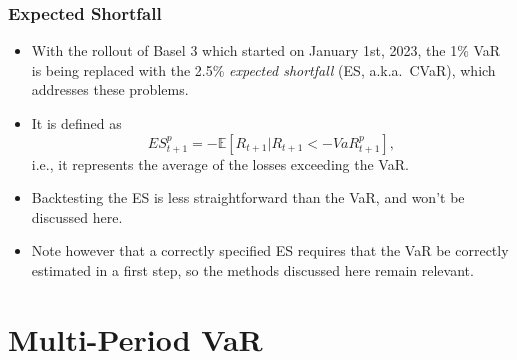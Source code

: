 \begin{frame}%

\frametitle{Expected Shortfall}

\begin{itemize}
\item With the rollout of Basel 3 which started on January 1st, 2023, the 1\% VaR is being replaced with the 2.5\%  \emph{%
\color{red}expected shortfall} (ES, a.k.a.\ CVaR), which addresses these problems.
\item It is defined as
\begin{equation*}
ES_{t+1}^{p}=-\mathbb{E}\left[ R_{t+1}|R_{t+1}<-VaR_{t+1}^{p}\right],
\end{equation*}
i.e., it represents the average of the losses exceeding the VaR.
\item Backtesting the ES is less straightforward than the VaR, and won't be discussed here.
\item Note however that a correctly specified ES requires that the VaR be correctly estimated in a first step,
so the methods discussed here remain relevant.
%
%
%
\end{itemize}

\end{frame}%
\section{Multi-Period VaR}\subsection*{}

